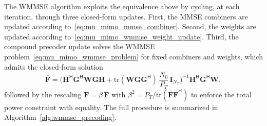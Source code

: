 The \ac{WMMSE} algorithm exploits the equivalence above by cycling, at each iteration, through three closed-form updates.
First, the \ac{MMSE} combiners are updated according to~\eqref{eq:mu_mimo_mmse_combiner}.
Second, the weights are updated according to~\eqref{eq:mu_mimo_wmmse_weight_update}.
Third, the compound precoder update solves the \ac{WMMSE} problem~\eqref{eq:mu_mimo_wmmse_problem} for fixed combiners and weights, which admits the closed-form solution~\cite{WMMSE_precoding_ref18}
\begin{equation}
\label{eq:mu_mimo_wmmse_precoder_update}
    \bar{\mathbf{F}} = \Big(\mathbf{H}^{\mathsf{H}} \mathbf{G}^{\mathsf{H}} \mathbf{W} \mathbf{G} \mathbf{H} + \mathrm{tr}(\mathbf{W} \mathbf{G} \mathbf{G}^{\mathsf{H}}) \, \frac{N_0}{P_T} \, \mathbf{I}_{N_T}\Big)^{-1} \mathbf{H}^{\mathsf{H}} \mathbf{G}^{\mathsf{H}} \mathbf{W},
\end{equation}
followed by the rescaling $\mathbf{F} = \beta \, \bar{\mathbf{F}}$ with $\beta^2 = P_T / \mathrm{tr}(\bar{\mathbf{F}} \bar{\mathbf{F}}^{\mathsf{H}})$ to enforce the total power constraint with equality.
The full procedure is summarized in Algorithm~\ref{alg:wmmse_precoding}.


